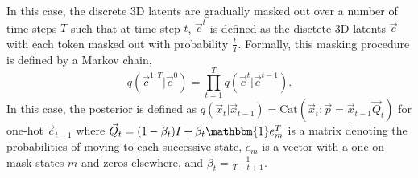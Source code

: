 In this case, the discrete 3D latents are gradually masked out over a number of time steps $T$ such that at time step $t$, $\vec{c}^t$ is defined as the disctete 3D latents $\vec{c}$ with each token masked out with probability $\frac{t}{T}$. Formally, this masking procedure is defined by a Markov chain,
%
\begin{equation}
    q(\vec{c}^{1:T}|\vec{c}^0) = \prod_{t=1}^T q(\vec{c}^t| \vec{c}^{t-1}).
\end{equation}
%
In this case, the posterior is defined as $q(\vec{x}_t|\vec{x}_{t-1})= \text{Cat}(\vec{x}_t;\vec{p}=\vec{x}_{t-1} \vec{Q}_t)$ for one-hot $\vec{c}_{t-1}$ where $\vec{Q}_t = (1-\beta_t)I + \beta_t \mathbbm{1}e_m^T$ is a matrix denoting the probabilities of moving to each successive state, $e_m$ is a vector with a one on mask states $m$ and zeros elsewhere, and $\beta_t = \frac{1}{T-t+1}$.